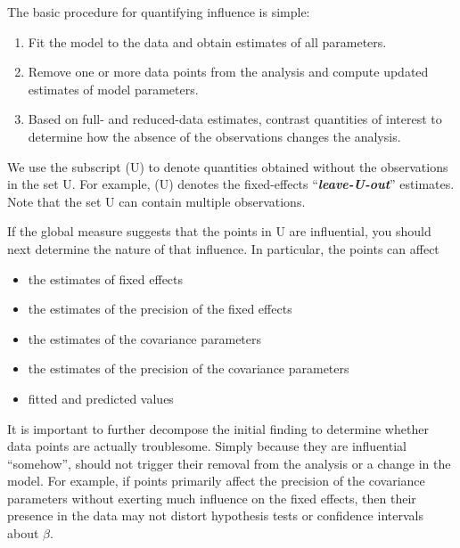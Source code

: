 \documentclass[12pt, a4paper]{article}
\begin{document}
The basic procedure for quantifying influence is simple:

\begin{enumerate}
	\item Fit the model to the data and obtain estimates of all parameters.
	\item Remove one or more data points from the analysis and compute updated estimates of model parameters.
	\item Based on full- and reduced-data estimates, contrast quantities of interest to determine how the absence
	of the observations changes the analysis.
\end{enumerate}
We use the subscript (U) to denote quantities obtained without the observations in the set U. For example,
(U) denotes the fixed-effects “\textit{\textbf{leave-U-out}}” estimates. Note that the set U can contain multiple observations.


If the global measure suggests that the points in U are influential, you should next determine the nature of
that influence. In particular, the points can affect
\begin{itemize}
	\item the estimates of fixed effects
	\item the estimates of the precision of the fixed effects
	\item the estimates of the covariance parameters
	\item the estimates of the precision of the covariance parameters
	\item fitted and predicted values
\end{itemize}

It is important to further decompose the initial finding to determine whether data points are actually troublesome.
Simply because they are influential “somehow”, should not trigger their removal from the analysis or
a change in the model. For example, if points primarily affect the precision of the covariance parameters
without exerting much influence on the fixed effects, then their presence in the data may not distort hypothesis
tests or confidence intervals about $\beta$.

\end{document}
